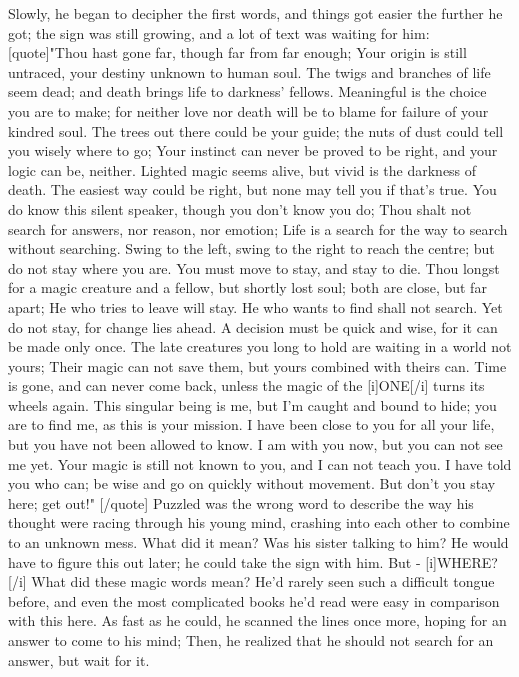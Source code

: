 Slowly, he began to decipher the first words, and things got easier the further he got; the sign was still growing, and a lot of text was waiting for him:
[quote]"Thou hast gone far, 
though far from far enough; 
Your origin is still untraced, 
your destiny unknown to human soul. 
The twigs and branches of life seem dead; 
and death brings life to darkness' fellows. 
Meaningful is the choice you are to make; 
for neither love nor death will be to blame 
for failure of your kindred soul. 
The trees out there could be your guide; 
the nuts of dust could tell you wisely 
where to go; 
Your instinct can never be proved to be right, 
and your logic can be, neither. 
Lighted magic seems alive, 
but vivid is the darkness of death. 
The easiest way could be right, 
but none may tell you if that's true. 
You do know this silent speaker, 
though you don't know you do; 
Thou shalt not search for answers, 
nor reason, nor emotion; 
Life is a search for the way 
to search without searching. 
Swing to the left, swing to the right 
to reach the centre; 
but do not stay where you are. 
You must move to stay, 
and stay to die. 
Thou longst for a magic creature 
and a fellow, but shortly lost soul; 
both are close, but far apart; 
He who tries to leave will stay. 
He who wants to find shall not search. 
Yet do not stay, for change lies ahead. 
A decision must be quick and wise, 
for it can be made only once. 
The late creatures you long to hold are waiting 
in a world not yours; 
Their magic can not save them, 
but yours combined with theirs can. 
Time is gone, 
and can never come back, 
unless the magic of the [i]ONE[/i] 
turns its wheels again. 
This singular being is me, 
but I'm caught and bound to hide; 
you are to find me, 
as this is your mission. 
I have been close to you for all your life, 
but you have not been allowed to know. 
I am with you now, 
but you can not see me yet. 
Your magic is still not known to you, 
and I can not teach you. 
I have told you who can; 
be wise and go on quickly 
without movement. 
But don't you stay here; 
get out!" 
[/quote]
Puzzled was the wrong word to describe the way his thought were racing through his young mind, crashing into each other to combine to an unknown mess. 
What did it mean? Was his sister talking to him? 
He would have to figure this out later; he could take the sign with him. But - [i]WHERE?[/i] 
What did these magic words mean? He'd rarely seen such a difficult tongue before, and even the most complicated books he'd read were easy in comparison with this here. 
As fast as he could, he scanned the lines once more, hoping for an answer to come to his mind; Then, he realized that he should not search for an answer, but wait for it. 
